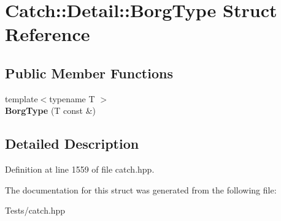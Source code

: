 \hypertarget{struct_catch_1_1_detail_1_1_borg_type}{}\section{Catch\+:\+:Detail\+:\+:Borg\+Type Struct Reference}
\label{struct_catch_1_1_detail_1_1_borg_type}
\subsection*{Public Member Functions}
\begin{DoxyCompactItemize}
\item 
\mbox{\label{struct_catch_1_1_detail_1_1_borg_type_a780a9946ed0d654f0bfc043c8fc505d8}} 
{\footnotesize template$<$typename T $>$ }\\{\bfseries Borg\+Type} (T const \&)
\end{DoxyCompactItemize}


\subsection{Detailed Description}


Definition at line 1559 of file catch.\+hpp.



The documentation for this struct was generated from the following file\+:\begin{DoxyCompactItemize}
\item 
Tests/catch.\+hpp\end{DoxyCompactItemize}
